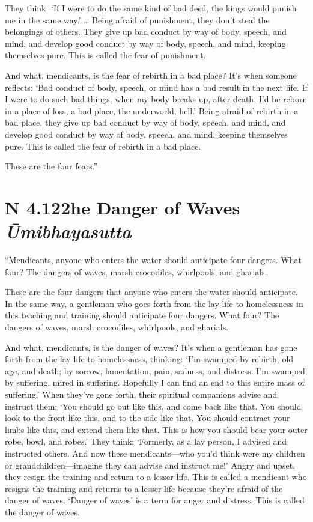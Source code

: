 \documentclass[12pt,openany]{book}%
\newcommand*{\suttatitleacronym}[1]{\smaller[2]{#1}\vspace*{.3em}}
\newcommand*{\suttatitletranslation}[1]{\linebreak{#1}}
\newcommand*{\suttatitleroot}[1]{\linebreak\smaller[2]\itshape{#1}}
\newcommand*{\tocacronym}[1]{\hspace*{-3.3em}{#1}\quad}
\newcommand*{\toctranslation}[1]{#1}
\newcommand*{\tocroot}[1]{(\textit{#1})}
\begin{document}
They think: ‘If I were to do the same kind of bad deed, the kings would punish me in the same way.’ … Being afraid of punishment, they don’t steal the belongings of others. They give up bad conduct by way of body, speech, and mind, and develop good conduct by way of body, speech, and mind, keeping themselves pure. This is called the fear of punishment. 

And what, mendicants, is the fear of rebirth in a bad place? It’s when someone reflects: ‘Bad conduct of body, speech, or mind has a bad result in the next life. If I were to do such bad things, when my body breaks up, after death, I’d be reborn in a place of loss, a bad place, the underworld, hell.’ Being afraid of rebirth in a bad place, they give up bad conduct by way of body, speech, and mind, and develop good conduct by way of body, speech, and mind, keeping themselves pure. This is called the fear of rebirth in a bad place. 

These are the four fears.” 

%
\section*{{\suttatitleacronym AN 4.122}{\suttatitletranslation The Danger of Waves }{\suttatitleroot Ūmibhayasutta}}
\addcontentsline{toc}{section}{\tocacronym{AN 4.122} \toctranslation{The Danger of Waves } \tocroot{Ūmibhayasutta}}

“Mendicants, anyone who enters the water should anticipate four dangers. What four? The dangers of waves, marsh crocodiles, whirlpools, and gharials. 

These are the four dangers that anyone who enters the water should anticipate. In the same way, a gentleman who goes forth from the lay life to homelessness in this teaching and training should anticipate four dangers. What four? The dangers of waves, marsh crocodiles, whirlpools, and gharials. 

And what, mendicants, is the danger of waves? It’s when a gentleman has gone forth from the lay life to homelessness, thinking: ‘I’m swamped by rebirth, old age, and death; by sorrow, lamentation, pain, sadness, and distress. I’m swamped by suffering, mired in suffering. Hopefully I can find an end to this entire mass of suffering.’ When they’ve gone forth, their spiritual companions advise and instruct them: ‘You should go out like this, and come back like that. You should look to the front like this, and to the side like that. You should contract your limbs like this, and extend them like that. This is how you should bear your outer robe, bowl, and robes.’ They think: ‘Formerly, as a lay person, I advised and instructed others. And now these mendicants—who you’d think were my children or grandchildren—imagine they can advise and instruct me!’ Angry and upset, they resign the training and return to a lesser life. This is called a mendicant who resigns the training and returns to a lesser life because they’re afraid of the danger of waves. ‘Danger of waves’ is a term for anger and distress. This is called the danger of waves. 
\end{document}
